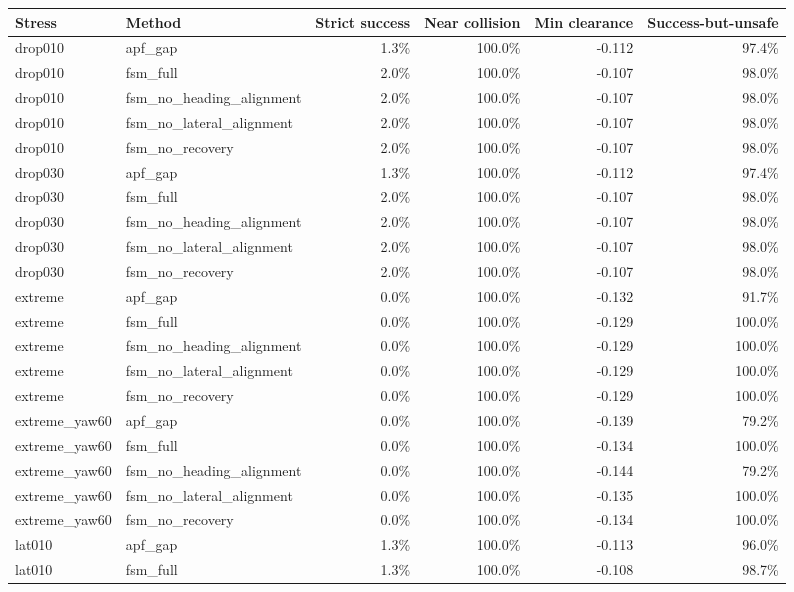 \begin{tabular}{llrrrr}
\toprule
Stress & Method & Strict success & Near collision & Min clearance & Success-but-unsafe \\
\midrule
drop010 & apf\_gap & 1.3\% & 100.0\% & -0.112 & 97.4\% \\
drop010 & fsm\_full & 2.0\% & 100.0\% & -0.107 & 98.0\% \\
drop010 & fsm\_no\_heading\_alignment & 2.0\% & 100.0\% & -0.107 & 98.0\% \\
drop010 & fsm\_no\_lateral\_alignment & 2.0\% & 100.0\% & -0.107 & 98.0\% \\
drop010 & fsm\_no\_recovery & 2.0\% & 100.0\% & -0.107 & 98.0\% \\
drop030 & apf\_gap & 1.3\% & 100.0\% & -0.112 & 97.4\% \\
drop030 & fsm\_full & 2.0\% & 100.0\% & -0.107 & 98.0\% \\
drop030 & fsm\_no\_heading\_alignment & 2.0\% & 100.0\% & -0.107 & 98.0\% \\
drop030 & fsm\_no\_lateral\_alignment & 2.0\% & 100.0\% & -0.107 & 98.0\% \\
drop030 & fsm\_no\_recovery & 2.0\% & 100.0\% & -0.107 & 98.0\% \\
extreme & apf\_gap & 0.0\% & 100.0\% & -0.132 & 91.7\% \\
extreme & fsm\_full & 0.0\% & 100.0\% & -0.129 & 100.0\% \\
extreme & fsm\_no\_heading\_alignment & 0.0\% & 100.0\% & -0.129 & 100.0\% \\
extreme & fsm\_no\_lateral\_alignment & 0.0\% & 100.0\% & -0.129 & 100.0\% \\
extreme & fsm\_no\_recovery & 0.0\% & 100.0\% & -0.129 & 100.0\% \\
extreme\_yaw60 & apf\_gap & 0.0\% & 100.0\% & -0.139 & 79.2\% \\
extreme\_yaw60 & fsm\_full & 0.0\% & 100.0\% & -0.134 & 100.0\% \\
extreme\_yaw60 & fsm\_no\_heading\_alignment & 0.0\% & 100.0\% & -0.144 & 79.2\% \\
extreme\_yaw60 & fsm\_no\_lateral\_alignment & 0.0\% & 100.0\% & -0.135 & 100.0\% \\
extreme\_yaw60 & fsm\_no\_recovery & 0.0\% & 100.0\% & -0.134 & 100.0\% \\
lat010 & apf\_gap & 1.3\% & 100.0\% & -0.113 & 96.0\% \\
lat010 & fsm\_full & 1.3\% & 100.0\% & -0.108 & 98.7\% \\

\end{tabular}

